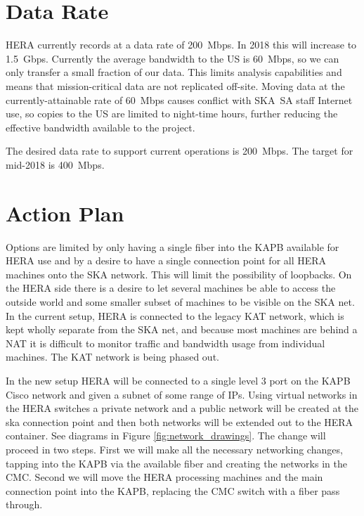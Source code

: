 \documentclass{article}
\begin{document}
\section{Data Rate}
HERA currently records at a data rate of 200~Mbps. In 2018 this will increase to 1.5~Gbps. Currently the average bandwidth to the US is 60~Mbps, so we can only transfer a small fraction of our data. This limits analysis capabilities and means that mission-critical data are not replicated off-site. Moving data at the currently-attainable rate of 60~Mbps causes conflict with SKA~SA staff Internet use, so copies to the US are limited to night-time hours, further reducing the effective bandwidth available to the project.

The desired data rate to support current operations is 200~Mbps. The target for mid-2018 is 400~Mbps.

\section{Action Plan}
Options are limited by only having a single fiber into the KAPB available for HERA use and by a desire to have a single connection point for all HERA machines onto the SKA network. This will limit the possibility of loopbacks.  On the HERA side there is a desire to let several machines be able to access the outside world and some smaller subset of machines to be visible on the SKA net.  In the current setup, HERA is connected to the legacy KAT network, which is kept wholly separate from the SKA net, and because most machines are behind a NAT it is difficult to monitor traffic and bandwidth usage from individual machines. The KAT network is being phased out.  

In the new setup HERA will be connected to a single level 3 port on the KAPB Cisco network and given a subnet of some range of IPs. Using virtual networks in the HERA switches a private network and a public network will be created at the ska connection point and then both networks will be extended out to the HERA container. See diagrams in Figure \ref{fig:network_drawings}.  The change will proceed in two steps. First we will make all the necessary networking changes, tapping into the KAPB via the available fiber and creating the networks in the CMC. Second we will move the HERA processing machines and the main connection point into the KAPB, replacing the CMC switch with a fiber pass through.
\end{document}
